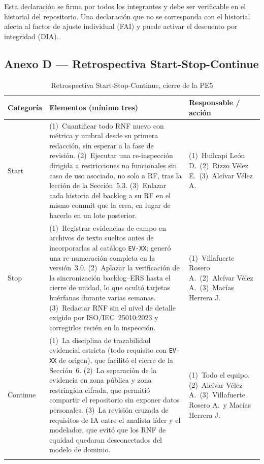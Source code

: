 \documentclass[11pt,a4paper]{article}
\newcommand{\id}[1]{\texttt{#1}}
\begin{document}
\noindent\small Esta declaración se firma por todos los integrantes y debe ser verificable en el
historial del repositorio. Una declaración que no se corresponda con el historial afecta al factor
de ajuste individual (FAI) y puede activar el descuento por integridad (DIA).

\subsection*{Anexo D --- Retrospectiva Start-Stop-Continue}

\begin{longtable}{|L{2.0cm}|L{7.0cm}|L{4.7cm}|}
\hline
{}\textbf{Categoría} & \textbf{Elementos (mínimo tres)} & \textbf{Responsable / acción} \\
\hline
\endhead
Start & (1)~Cuantificar todo RNF nuevo con métrica y umbral desde su primera redacción, sin
esperar a la fase de revisión. (2)~Ejecutar una re-inspección dirigida a restricciones no
funcionales sin caso de uso asociado, no solo a RF, tras la lección de la Sección~5.3. (3)~Enlazar
cada historia del backlog a su RF en el mismo commit que la crea, en lugar de hacerlo en un lote
posterior. & (1)~Huilcapi León D.\ (2)~Rizzo Vélez E.\ (3)~Alcívar Vélez A. \\ \hline
Stop & (1)~Registrar evidencias de campo en archivos de texto sueltos antes de incorporarlas al
catálogo \id{EV-XX}; generó una re-numeración completa en la versión~3.0. (2)~Aplazar la
verificación de la sincronización backlog--ERS hasta el cierre de unidad, lo que ocultó tarjetas
huérfanas durante varias semanas. (3)~Redactar RNF sin el nivel de detalle exigido por
ISO/IEC~25010:2023 y corregirlos recién en la inspección. & (1)~Villafuerte Rosero A.\
(2)~Alcívar Vélez A.\ (3)~Macías Herrera J. \\ \hline
Continue & (1)~La disciplina de trazabilidad evidencial estricta (todo requisito con
\id{EV-XX} de origen), que facilitó el cierre de la Sección~6. (2)~La separación de la evidencia en
zona pública y zona restringida cifrada, que permitió compartir el repositorio sin exponer datos
personales. (3)~La revisión cruzada de requisitos de IA entre el analista líder y el modelador,
que evitó que los RNF de equidad quedaran desconectados del modelo de dominio. &
(1)~Todo el equipo. (2)~Alcívar Vélez A.\ (3)~Villafuerte Rosero A.\ y Macías Herrera J. \\ \hline
\caption{Retrospectiva Start-Stop-Continue, cierre de la PE5}
\end{longtable}
\end{document}
